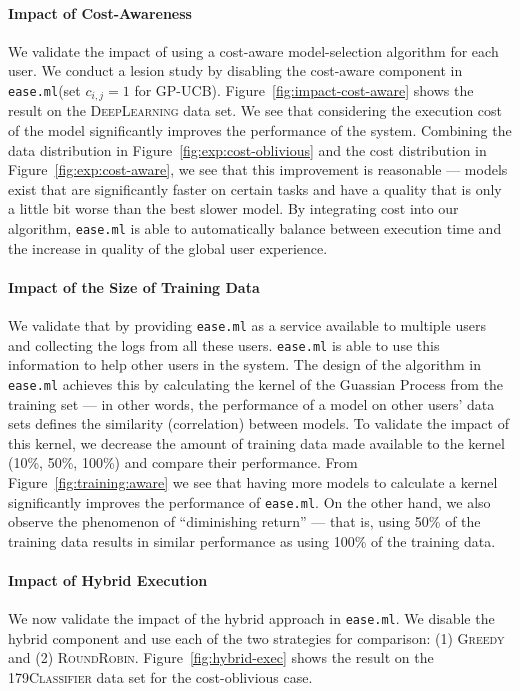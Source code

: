 \documentclass[letterpaper]{vldb}
\newcommand{\eml}{\texttt{ease.ml}\xspace}
\begin{document}
\vspace{-1em}
\paragraph*{Impact of Cost-Awareness}
We validate the impact of using 
a cost-aware model-selection algorithm
for each user. We conduct a lesion
study by disabling the cost-aware
component in \eml (set $c_{i,j}=1$
for GP-UCB). Figure~\ref{fig:impact-cost-aware}
shows the result on the \textsc{DeepLearning} data set.
We see that considering the
execution cost of the model significantly
improves the performance of the system.
Combining the data distribution in
Figure~\ref{fig:exp:cost-oblivious}
and the cost distribution in 
Figure~\ref{fig:exp:cost-aware},
we see that this improvement
is reasonable --- models exist
that are significantly faster
on certain tasks and have a quality that
is only a little bit worse than the
best slower model. By integrating
cost into our algorithm, \eml is
able to automatically balance between
execution time and the increase in quality of the global
user experience.

\vspace{-1em}
\paragraph*{Impact of the Size of Training Data}

We validate that by providing \eml as
a service available to multiple users
and collecting the logs from all these users.
\eml is able to use this information to
help other users in the system. The
design of the algorithm in \eml achieves
this by calculating the kernel of the Guassian Process from the training set --- in other words,
the performance of a model on other users'
data sets defines the similarity (correlation)
between models. To validate the impact
of this kernel, we decrease the amount
of training data made available to
the kernel (10\%, 50\%, 100\%) and compare their performance. 
From Figure~\ref{fig:training:aware}
we see that having more models to 
calculate a kernel significantly improves
the performance of \eml. On the other hand,
we also observe the phenomenon of ``diminishing
return'' --- that is, using 50\% of the
training data results in similar performance
as using 100\% of the training data.

\vspace{-1em}
\paragraph*{Impact of Hybrid Execution}
We now validate the impact of the hybrid 
approach in \eml.
We disable the hybrid component and use each
of the two strategies for comparison: (1)
\textsc{Greedy} and (2) \textsc{RoundRobin}.
Figure~\ref{fig:hybrid-exec} shows the result
on the \textsc{179Classifier} data set
for the cost-oblivious case.
\end{document}
